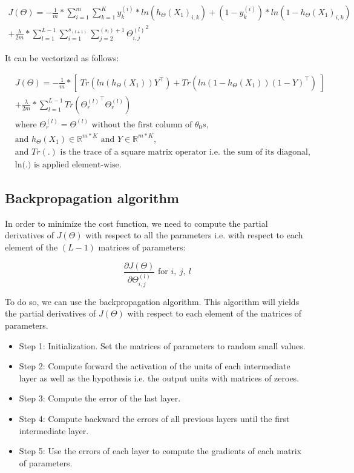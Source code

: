 \documentclass[a4paper, 12pt]{article}
\begin{document}
\begin{equation}
\begin{split}
J(\Theta) = -\frac{1}{m} * \sum_{i=1}^{m} \sum_{k=1}^{K} y_{k}^{(i)} * ln({h_{\Theta}(X_{1})}_{i,k}) + (1-y_{k}^{(i)}) * ln(1-{h_{\Theta}(X_{1})}_{i,k}) \\
+ \frac{\lambda}{2m} * \sum_{l=1}^{L-1} \sum_{i=1}^{s_{(l+1)}} \sum_{j=2}^{(s_{l})+1} {\Theta^{(l)}_{i,j}}^{2}
\end{split}
\end{equation}

It can be vectorized as follows:

\begin{align*}
& J(\Theta) = -\frac{1}{m}  * \left[ \; Tr \left(ln(h_{\Theta}(X_{1}))Y^{\top}\right) + Tr\left(ln(1-h_{\Theta}(X_{1}))(1-Y)^{\top} \right) \; \right] \\
& + \frac{\lambda}{2m}*\sum_{l=1}^{L-1}Tr\left({\Theta_{r}^{(l)}}^{\top}\Theta_{r}^{(l)}\right) \\
& \text{where } \Theta_{r}^{(l)} = \Theta^{(l)} \text{ without the first column of }\theta_0s, \\
& \text{and }  h_{\Theta}(X_{1}) \in \mathbb{R}^{m*K} \text{ and } Y \in \mathbb{R}^{m*K}, \\
& \text{and } Tr(.) \text{ is the trace of a square matrix operator i.e. the sum of its diagonal}, \\
& \text{ln(.) is applied element-wise}. 
\end{align*}

\subsection{Backpropagation algorithm}

In order to minimize the cost function, we need to compute the partial derivatives of $J(\Theta)$ with respect to all the parameters i.e. with respect to each element of the $(L-1)$ matrices of parameters:

\begin{equation}
\frac{\partial J(\Theta)}{\partial \Theta_{i, j}^{(l)}} \text{ for } i, \: j, \: l
\end{equation}

To do so, we can use the backpropagation algorithm. This algorithm will yields the partial derivatives of $J(\Theta)$ with respect to each element of the matrices of parameters. 

\begin{itemize}
\item Step 1: Initialization. Set the matrices of parameters to random small values.
\item Step 2: Compute forward the activation of the units of each intermediate layer as well as the hypothesis i.e. the output units with matrices of zeroes.
\item Step 3: Compute the error of the last layer.
\item Step 4: Compute backward the errors of all previous layers until the first intermediate layer.
\item Step 5: Use the errors of each layer to compute the gradients of each matrix of parameters.
\end{itemize}
\end{document}
